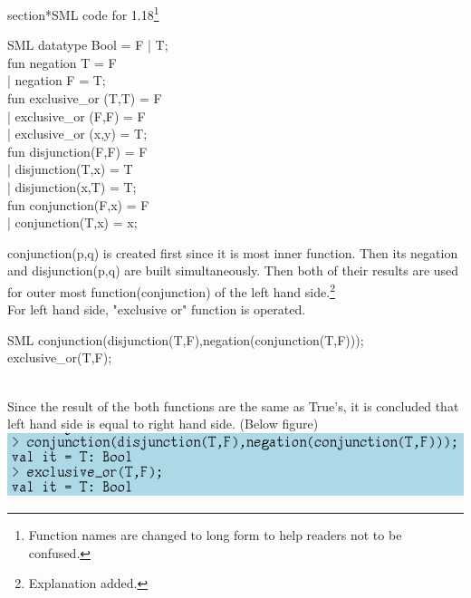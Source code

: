 \documentclass[11pt]{article}
\begin{document}
section*{SML code for 1.18}\footnote{Function names are changed to long form to help readers not to be confused. }
\begin{GFT}{SML}
\+datatype Bool = F | T;\\
\+fun negation T = F\\
\+ | negation F = T;\\
\+fun exclusive\_or (T,T) = F\\
\+ | exclusive\_or (F,F) = F\\
\+ | exclusive\_or (x,y) = T;\\
\+fun disjunction(F,F) = F\\
\+ | disjunction(T,x) = T\\
\+ | disjunction(x,T) = T;\\
\+fun conjunction(F,x) = F\\
\+ | conjunction(T,x) = x;\\
\end{GFT}
\clearpage
conjunction(p,q) is created first since it is most inner function. Then its negation and disjunction(p,q) are built simultaneously. Then both of their results are used for outer most function(conjunction) of the left hand side.\footnote{Explanation added.}\\
For left hand side, "exclusive or" function is operated.\\
\begin{GFT}{SML}
\+conjunction(disjunction(T,F),negation(conjunction(T,F)));\\
\+exclusive\_or(T,F);\\
\+\\
\end{GFT}
Since the result of the both functions are the same as True's, it is concluded that left hand side is equal to right hand side. (Below figure) \\
\includegraphics[scale=0.6]{118.png}
\clearpage
\end{document}

